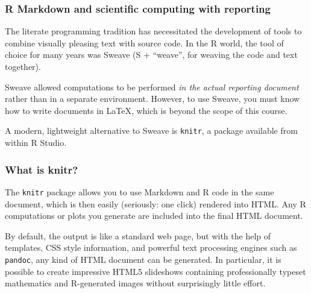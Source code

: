 \documentclass[11pt,ignorenonframetext,aspectratio=169]{beamer}
\begin{document}
\begin{frame}\frametitle{R Markdown and scientific computing with
reporting}

The literate programming tradition has necessitated the development of
tools to combine visually pleasing text with source code. In the R
world, the tool of choice for many years was Sweave (S + ``weave'', for
weaving the code and text together).

Sweave allowed computations to be performed \emph{in the actual
reporting document} rather than in a separate environment. However, to
use Sweave, you must know how to write documents in LaTeX, which is
beyond the scope of this course.

A modern, lightweight alternative to Sweave is \texttt{knitr}, a package
available from within R Studio.

\end{frame}

\begin{frame}\frametitle{What is knitr?}

The \texttt{knitr} package allows you to use Markdown and R code in the
same document, which is then easily (seriously: one click) rendered into
HTML. Any R computations or plots you generate are included into the
final HTML document.

By default, the output is like a standard web page, but with the help of
templates, CSS style information, and powerful text processing engines
such as \texttt{pandoc}, any kind of HTML document can be generated. In
particular, it is possible to create impressive HTML5 slideshows
containing professionally typeset mathematics and R-generated images
without surprisingly little effort.

\end{frame}
\end{document}
